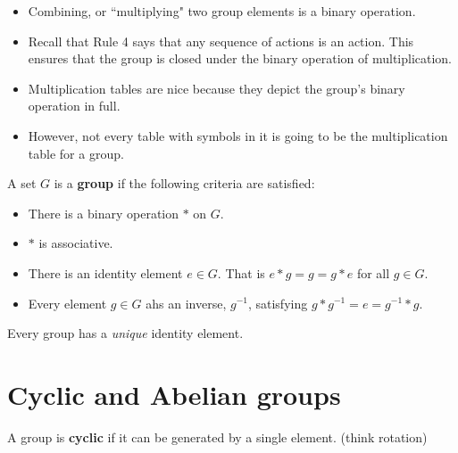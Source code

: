 \documentclass[twocolumn]{article}
\begin{document}
\begin{itemize}
    \item Combining, or ``multiplying" two group elements is a binary operation. 
    \item Recall that Rule 4 says that any sequence of actions is an action. This ensures that the group is closed under the binary operation of multiplication.
    \item Multiplication tables are nice because they depict the group's binary operation in full.
    \item However, not every table with symbols in it is going to be the multiplication table for a group.
\end{itemize}

\begin{tcolorbox}[colback=blue!5!white,colframe=blue!15!white,coltitle=black, boxrule=0pt,title=Definition of a group, drop shadow southeast, enhanced]
    A set $G$ is a \textbf{group} if the following criteria are satisfied:
    \begin{itemize}
        \item There is a binary operation $*$ on $G$.
        \item $*$ is associative.
        \item There is an identity element $e \in G$. That is $e *g = g =  g*e$ for all $g \in G$.
        \item Every element $g \in G$ ahs an inverse, $g^{-1}$, satisfying $g*g^{-1} = e = g^{-1} * g$.
    \end{itemize}
\end{tcolorbox}

\begin{tcolorbox}[colback=blue!5!white,colframe=blue!15!white,coltitle=black, boxrule=0pt,title=Theorem, drop shadow southeast, enhanced]
    Every group has a \textit{unique} identity element.
\end{tcolorbox}

\section{Cyclic and Abelian groups}

\begin{tcolorbox}[colback=blue!5!white,colframe=blue!15!white,coltitle=black, boxrule=0pt,title=Definition, drop shadow southeast, enhanced]
    A group is \textbf{cyclic} if it can be generated by a single element. (think rotation)
\end{tcolorbox}
\end{document}
